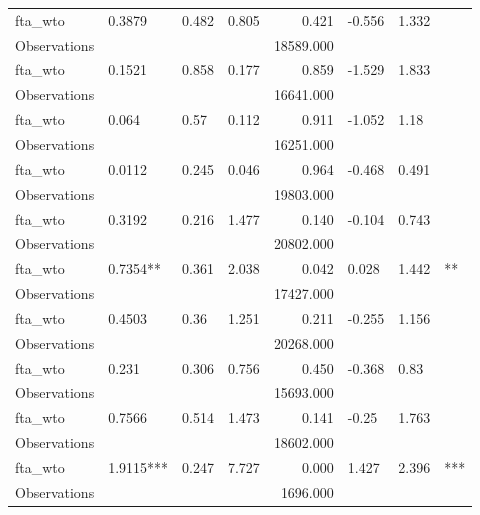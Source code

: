 \begin{tabular}{llllrlll}
fta\_wto      &     0.3879 &   0.482 &  0.805 &      0.421 & -0.556 &  1.332 &              \\
Observations &            &         &        &  18589.000 &        &        &              \\
fta\_wto      &     0.1521 &   0.858 &  0.177 &      0.859 & -1.529 &  1.833 &              \\
Observations &            &         &        &  16641.000 &        &        &              \\
fta\_wto      &      0.064 &    0.57 &  0.112 &      0.911 & -1.052 &   1.18 &              \\
Observations &            &         &        &  16251.000 &        &        &              \\
fta\_wto      &     0.0112 &   0.245 &  0.046 &      0.964 & -0.468 &  0.491 &              \\
Observations &            &         &        &  19803.000 &        &        &              \\
fta\_wto      &     0.3192 &   0.216 &  1.477 &      0.140 & -0.104 &  0.743 &              \\
Observations &            &         &        &  20802.000 &        &        &              \\
fta\_wto      &   0.7354** &   0.361 &  2.038 &      0.042 &  0.028 &  1.442 &           ** \\
Observations &            &         &        &  17427.000 &        &        &              \\
fta\_wto      &     0.4503 &    0.36 &  1.251 &      0.211 & -0.255 &  1.156 &              \\
Observations &            &         &        &  20268.000 &        &        &              \\
fta\_wto      &      0.231 &   0.306 &  0.756 &      0.450 & -0.368 &   0.83 &              \\
Observations &            &         &        &  15693.000 &        &        &              \\
fta\_wto      &     0.7566 &   0.514 &  1.473 &      0.141 &  -0.25 &  1.763 &              \\
Observations &            &         &        &  18602.000 &        &        &              \\
fta\_wto      &  1.9115*** &   0.247 &  7.727 &      0.000 &  1.427 &  2.396 &          *** \\
Observations &            &         &        &   1696.000 &        &        &              \\
\bottomrule
\end{tabular}

